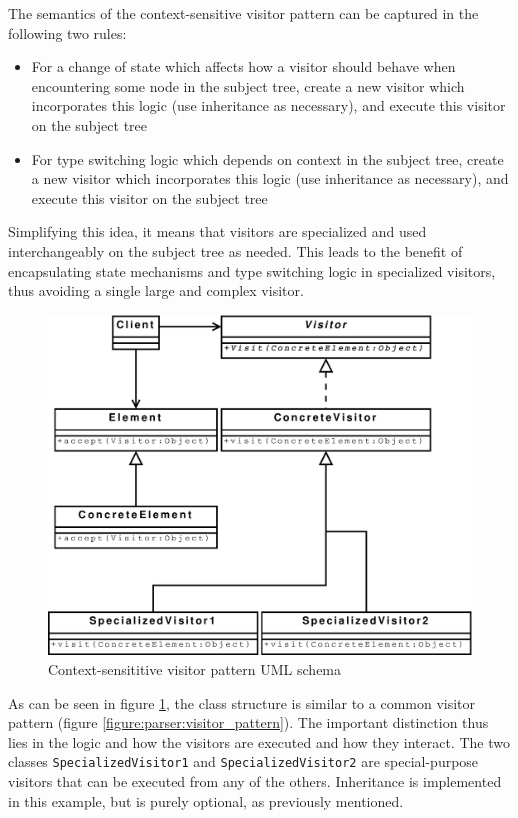 The semantics of the context-sensitive visitor pattern can be captured in the
following two rules:
\begin{itemize}
  \item For a change of state which affects how a visitor should behave when
  encountering some node in the subject tree, create a new visitor which
  incorporates this logic (use inheritance as necessary), and execute this
  visitor on the subject tree
  \item For type switching logic which depends on context in the subject tree,
  create a new visitor which incorporates this logic (use inheritance as
  necessary), and execute this visitor on the subject tree
\end{itemize}

Simplifying this idea, it means that visitors are specialized and used
interchangeably on the subject tree as needed. This leads to the benefit of
encapsulating state mechanisms and type switching logic in specialized
visitors, thus avoiding a single large and complex visitor.

\begin{figure}[h]
  \centering
    \includegraphics[scale=0.40]{diagrams/context_visitor_pattern} 
  \caption{Context-sensititive visitor pattern UML schema}
  \label{figure:parser:context_visitor_pattern}
\end{figure}

As can be seen in figure \ref{figure:parser:context_visitor_pattern}, the
class structure is similar to a common visitor pattern (figure
\ref{figure:parser:visitor_pattern}). The important distinction thus lies in
the logic and how the visitors are executed and how they interact. The two
classes \verb!SpecializedVisitor1! and \verb!SpecializedVisitor2! are
special-purpose visitors that can be executed from any of the others.
Inheritance is implemented in this example, but is purely optional, as
previously mentioned.

